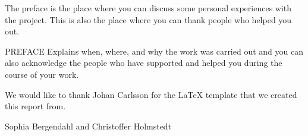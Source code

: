 The preface is the place where you can discuss some personal
experiences with the project. This is also the place where you can
thank people who helped you out.

PREFACE Explains when, where, and why the work was carried out and you can also
acknowledge the people who have supported and helped you during the course of your
work.

We would like to thank Johan Carlsson for the LaTeX template that we 
created this report from.

\vspace*{2cm}%
\hfill Sophia Bergendahl and Christoffer Holmstedt
